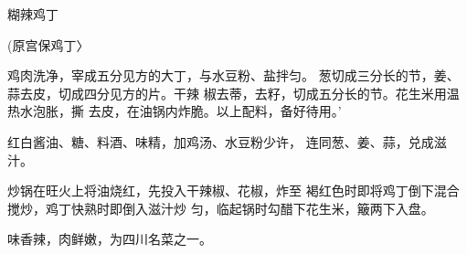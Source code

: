\begin{recipe}{糊辣鸡丁}

(原宫保鸡丁〉

\ingredients



\cooking

\step 	鸡肉洗净，宰成五分见方的大丁，与水豆粉、盐拌匀。 葱切成三分长的节，姜、蒜去皮，切成四分见方的片。干辣 椒去蒂，去籽，切成五分长的节。花生米用温热水泡胀，撕 去皮，在油锅内炸脆。以上配料，备好待用。’

\step 	红白酱油、糖、料酒、味精，加鸡汤、水豆粉少许， 连同葱、姜、蒜，兑成滋汁。

\step 	炒锅在旺火上将油烧红，先投入干辣椒、花椒，炸至 褐红色时即将鸡丁倒下混合搅炒，鸡丁快熟时即倒入滋汁炒 匀，临起锅时勾醋下花生米，簸两下入盘。

\notes

味香辣，肉鲜嫩，为四川名菜之一。

\end{recipe}

